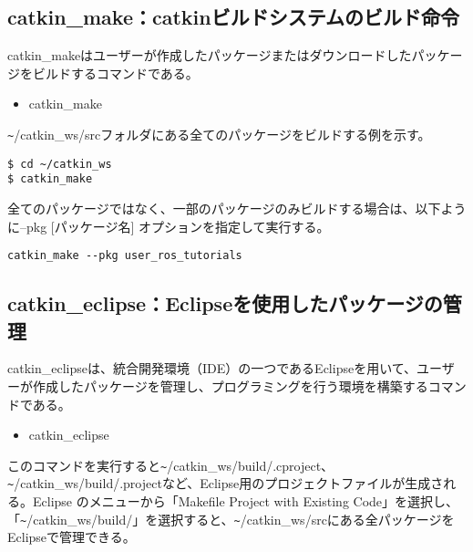 \subsection{catkin\_make：catkinビルドシステムのビルド命令}

catkin\_makeはユーザーが作成したパッケージまたはダウンロードしたパッケージをビルドするコマンドである。

\vspace{\baselineskip}
\begin{itemize}
\item  catkin\_make
\end{itemize}
\vspace{\baselineskip}

\verb|~|/catkin\_ws/srcフォルダにある全てのパッケージをビルドする例を示す。\\

\begin{lstlisting}[language=ROS]
$ cd ~/catkin_ws
$ catkin_make
\end{lstlisting}

全てのパッケージではなく、一部のパッケージのみビルドする場合は、以下ように--pkg [パッケージ名] オプションを指定して実行する。\\

\begin{lstlisting}[language=ROS]
catkin_make --pkg user_ros_tutorials
\end{lstlisting}

\subsection{catkin\_eclipse：Eclipseを使用したパッケージの管理}

catkin\_eclipseは、統合開発環境（IDE）の一つであるEclipseを用いて、ユーザーが作成したパッケージを管理し、プログラミングを行う環境を構築するコマンドである。

\vspace{\baselineskip}
\begin{itemize}
\item catkin\_eclipse
\end{itemize}
\vspace{\baselineskip}

このコマンドを実行すると\verb|~|/catkin\_ws/build/.cproject、\verb|~|/catkin\_ws/build/.projectなど、Eclipse用のプロジェクトファイルが生成される。Eclipse のメニューから「Makefile Project with Existing Code」を選択し、「\verb|~|/catkin\_ws/build/」を選択すると、\verb|~|/catkin\_ws/srcにある全パッケージをEclipseで管理できる。

